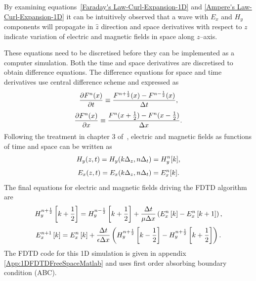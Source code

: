 By examining equations~\ref{Faraday's Law-Curl-Expansion-1D} and \ref{Ampere's Law-Curl-Expansion-1D} it can be intuitively observed that a wave with $E_x$ and $H_y$ components will propagate in $\hat{z}$ direction and space derivatives with respect to $z$ indicate variation of electric and magnetic fields in space along $z$--axis.

These equations need to be discretised before they can be implemented as a computer simulation. Both the time and space derivatives are discretised to obtain difference equations. The difference equations for space and time derivatives use central difference scheme and expressed as
\begin{equation}
\centering
\dfrac{\partial F^n(x)}{\partial t} \equiv \dfrac{F^{n+\frac{1}{2}}(x)-F^{n-\frac{1}{2}}(x)}{\Delta t},
\label{central-difference-time}
\end{equation}
\begin{equation}
\centering
\dfrac{\partial F^n(x)}{\partial x} \equiv \dfrac{F^n(x+\frac{1}{2})-F^n(x-\frac{1}{2})}{\Delta x}.
\label{central-difference-space}
\end{equation}
Following the treatment in chapter 3 of~\cite{JBSchneiderUFDTD}, electric and magnetic fields as functions of time and space can be written as
\begin{equation}
\centering
H_y (z,t)=H_y (k\Delta _z,n\Delta _t)=H^n_y[k],
\label{Hy-of-z_and_t}
\end{equation}
\begin{equation}
\centering
E_x (z,t)=E_x (k\Delta _z,n\Delta _t)=E^n_x[k].
\label{Ex-of-z_and_t}
\end{equation}
The final equations for electric and magnetic fields driving the FDTD algorithm are
\begin{equation}
\centering
H^{n+\frac{1}{2}}_y \left[k+\frac{1}{2}\right]=H^{n-\frac{1}{2}}_y \left[k+\frac{1}{2}\right] + \dfrac{\Delta t}{\mu \Delta x} \left( E^{n}_x \left[k\right] - E^{n}_x \left[k+1\right] \right),
\label{Hy-1D-Simple-FDTD-Driver}
\end{equation}
\begin{equation}
\centering
E^{n+1}_x \left[k\right]=E^{n}_x \left[k\right] + \dfrac{\Delta t}{\epsilon \Delta x} \left( H^{n+\frac{1}{2}}_y \left[k-\frac{1}{2}\right] - H^{n+\frac{1}{2}}_y \left[k+\frac{1}{2}\right] \right).
\label{Ex-1D-Simple-FDTD-Driver}
\end{equation}
The FDTD code for this 1D simulation is given in appendix \ref{App:1DFDTDFreeSpaceMatlab} and uses first order absorbing boundary condition (ABC).
